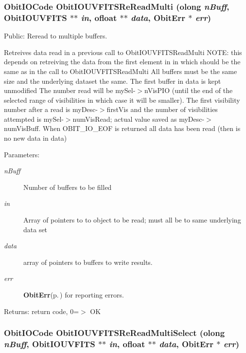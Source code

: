 \subsubsection{\setlength{\rightskip}{0pt plus 5cm}Obit\-IOCode Obit\-IOUVFITSRe\-Read\-Multi ({\bf olong} {\em n\-Buff}, {\bf Obit\-IOUVFITS} $\ast$$\ast$ {\em in}, {\bf ofloat} $\ast$$\ast$ {\em data}, {\bf Obit\-Err} $\ast$ {\em err})}\label{ObitIOUVFITS_8c_a30}


Public: Reread to multiple buffers. 

Retreives data read in a previous call to Obit\-IOUVFITSRead\-Multi NOTE: this depends on retreiving the data from the first element in in which should be the same as in the call to Obit\-IOUVFITSRead\-Multi All buffers must be the same size and the underlying dataset the same. The first buffer in data is kept unmodified The number read will be my\-Sel-$>$n\-Vis\-PIO (until the end of the selected range of visibilities in which case it will be smaller). The first visibility number after a read is my\-Desc-$>$first\-Vis and the number of visibilities attempted is my\-Sel-$>$num\-Vis\-Read; actual value saved as my\-Desc-$>$num\-Vis\-Buff. When OBIT\_\-IO\_\-EOF is returned all data has been read (then is no new data in data) \begin{Desc}
\item[Parameters:]
\begin{description}
\item[{\em n\-Buff}]Number of buffers to be filled \item[{\em in}]Array of pointers to to object to be read; must all be to same underlying data set \item[{\em data}]array of pointers to buffers to write results. \item[{\em err}]{\bf Obit\-Err}{\rm (p.\,\pageref{structObitErr})} for reporting errors. \end{description}
\end{Desc}
\begin{Desc}
\item[Returns:]return code, 0=$>$ OK \end{Desc}
\subsubsection{\setlength{\rightskip}{0pt plus 5cm}Obit\-IOCode Obit\-IOUVFITSRe\-Read\-Multi\-Select ({\bf olong} {\em n\-Buff}, {\bf Obit\-IOUVFITS} $\ast$$\ast$ {\em in}, {\bf ofloat} $\ast$$\ast$ {\em data}, {\bf Obit\-Err} $\ast$ {\em err})}\label{ObitIOUVFITS_8c_a32}


